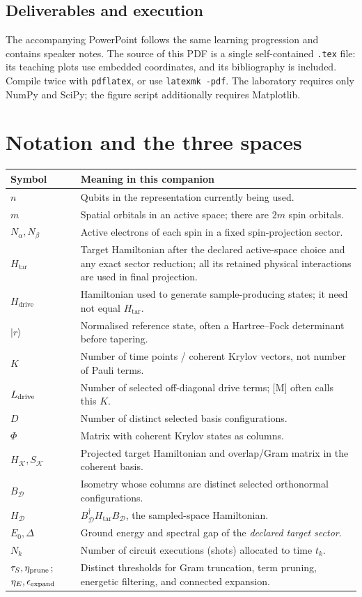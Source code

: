 \documentclass[11pt,a4paper,oneside]{report}
\newcommand{\ket}[1]{\lvert #1\rangle}
\newcommand{\Ht}{H_{\mathrm{tar}}}
\newcommand{\Hd}{H_{\mathrm{drive}}}
\newcommand{\HK}{H_{\mathcal K}}
\newcommand{\SK}{S_{\mathcal K}}
\newcommand{\HD}{H_{\mathcal D}}
\newcommand{\Dset}{\mathcal D}
\begin{document}
\section*{Deliverables and execution}
The accompanying PowerPoint follows the same learning progression and contains speaker notes. The source of this PDF is a single self-contained \texttt{.tex} file: its teaching plots use embedded coordinates, and its bibliography is included. Compile twice with \texttt{pdflatex}, or use \texttt{latexmk -pdf}. The laboratory requires only NumPy and SciPy; the figure script additionally requires Matplotlib.

\tableofcontents
\clearpage
\chapter*{Notation and the three spaces}
\begin{tabularx}{\linewidth}{@{}p{26mm}Y@{}}
\toprule Symbol & Meaning in this companion\\\midrule
$n$ & Qubits in the representation currently being used.\\
$m$ & Spatial orbitals in an active space; there are $2m$ spin orbitals.\\
$N_\alpha,N_\beta$ & Active electrons of each spin in a fixed spin-projection sector.\\
$\Ht$ & Target Hamiltonian after the declared active-space choice and any exact sector reduction; all its retained physical interactions are used in final projection.\\
$\Hd$ & Hamiltonian used to generate sample-producing states; it need not equal $\Ht$.\\
$\ket r$ & Normalised reference state, often a Hartree--Fock determinant before tapering.\\
$K$ & Number of time points / coherent Krylov vectors, not number of Pauli terms.\\
$L_{\rm drive}$ & Number of selected off-diagonal drive terms; [M] often calls this $K$.\\
$D$ & Number of distinct selected basis configurations.\\
$\Phi$ & Matrix with coherent Krylov states as columns.\\
$\HK,\SK$ & Projected target Hamiltonian and overlap/Gram matrix in the coherent basis.\\
$B_\Dset$ & Isometry whose columns are distinct selected orthonormal configurations.\\
$\HD$ & $B_\Dset^\dagger\Ht B_\Dset$, the sampled-space Hamiltonian.\\
$E_0,\Delta$ & Ground energy and spectral gap of the \emph{declared target sector}.\\
$N_k$ & Number of circuit executions (shots) allocated to time $t_k$.\\
$\tau_S,\eta_{\rm prune}$;\newline $\eta_E,\epsilon_{\rm expand}$ & Distinct thresholds for Gram truncation, term pruning, energetic filtering, and connected expansion.\\\bottomrule
\end{tabularx}
\end{document}
